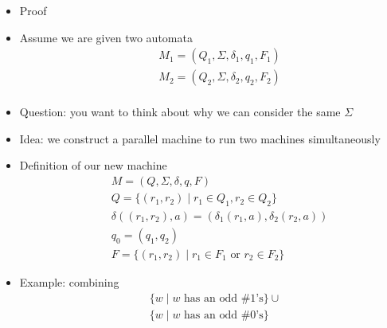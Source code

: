 \begin{frame}[allowframebreaks]
\begin{itemize}
\item Proof
\item [] Assume we are given two automata
  \begin{eqnarray*}
&& M_1 =(Q_1, \Sigma, \delta_1, q_1, F_1)\\
&& M_2 =(Q_2, \Sigma, \delta_2, q_2, F_2)\\
  \end{eqnarray*}
\item Question: you want to think about why we can consider the
  same $\Sigma$
\item Idea: we construct a parallel machine to run two
  machines simultaneously 
\item Definition of our new machine
  \begin{eqnarray*}
&& M =(Q, \Sigma, \delta, q, F)\\
&& Q=\{(r_1,r_2)\mid r_1 \in Q_1, r_2 \in Q_2\}\\
&& \delta((r_1,r_2),a)=(\delta_1(r_1,a), \delta_2(r_2,a))\\
&& q_0 = (q_1,q_2)\\
&& F=\{(r_1, r_2) \mid r_1 \in F_1 
\text{ or } r_2 \in F_2\}
  \end{eqnarray*}
\item Example: combining
  \begin{equation*}
    \begin{split}
      & \{ w \mid w \text{ has an odd \# 1's} \} \cup \\
      & \{ w \mid w \text{ has an odd \# 0's} \}
\end{split}
\end{equation*}
\begin{center}


\end{center}
\end{itemize}
\end{frame}
